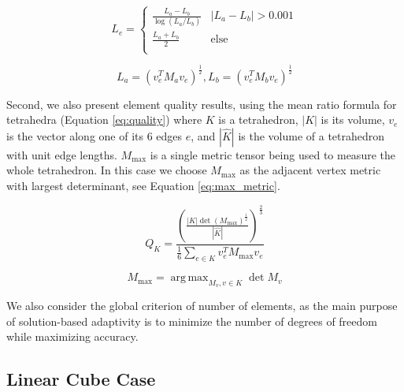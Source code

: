 \documentclass[3p,times,procedia,number]{elsarticle}
\DeclareMathOperator*{\argmax}{arg\,max}
\begin{document}
\begin{equation}
\label{eq:length}
L_e = \begin{cases}
\frac{L_a - L_b}{\log(L_a / L_b)} & |L_a - L_b| > 0.001 \\
\frac{L_a + L_b}{2} & \text{else} \\
\end{cases}
\end{equation}

\begin{equation}
\label{eq:endpoint_lengths}
L_a = (v_e^T M_a v_e)^{\frac12},
L_b = (v_e^T M_b v_e)^{\frac12}
\end{equation}

Second, we also present element quality results, using the
mean ratio formula for tetrahedra (Equation \ref{eq:quality})
where $K$ is a tetrahedron, $|K|$ is its volume,
$v_e$ is the vector along one of its 6 edges $e$,
and $|\hat{K}|$ is the volume of a tetrahedron
with unit edge lengths.
$M_{\text{max}}$ is a single metric tensor
being used to measure the whole tetrahedron.
In this case we choose $M_{\text{max}}$ as the
adjacent vertex metric with largest determinant,
see Equation \ref{eq:max_metric}.

\begin{equation}
\label{eq:quality}
Q_K =
 \frac{\left(\frac{|K|\det(M_{\text{max}})^{\frac12}}
                  {|\hat{K}|}
       \right)^{\frac{2}{3}}}
      {\frac16\sum_{e\in K}{v_e^T M_{\text{max}} v_e}}
\end{equation}

\begin{equation}
\label{eq:max_metric}
M_{\text{max}} = \argmax_{M_v, v\in K}{\det{M_v}}
\end{equation}

We also consider the global criterion of number of elements,
as the main purpose of solution-based adaptivity is to
minimize the number of degrees of freedom while maximizing
accuracy.

\subsection{Linear Cube Case}
\end{document}
